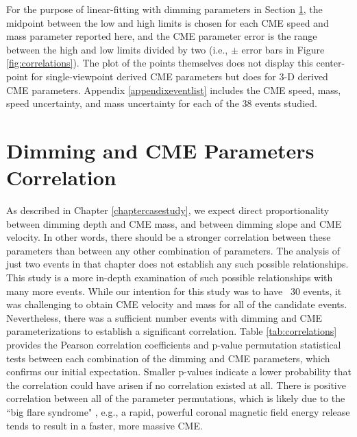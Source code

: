 For the purpose of linear-fitting with dimming parameters in Section \ref{sec:correlation}, the midpoint between the low and high limits is chosen for each CME speed and mass parameter reported here, and the CME parameter error is the range between the high and low limits divided by two (i.e., $\pm$ error bars in Figure \ref{fig:correlations}). The plot of the points themselves does not display this center-point for single-viewpoint derived CME parameters but does for 3-D derived CME parameters. Appendix \ref{appendixeventlist} includes the CME speed, mass, speed uncertainty, and mass uncertainty for each of the 38 events studied.

\section{Dimming and CME Parameters Correlation}
\label{sec:correlation}
As described in Chapter \ref{chaptercasestudy}, we expect direct proportionality between dimming depth and CME mass, and between dimming slope and CME velocity. In other words, there should be a stronger correlation between these parameters than between any other combination of parameters. The analysis of just two events in that chapter does not establish any such possible relationships. This study is a more in-depth examination of such possible relationships with many more events. While our intention for this study was to have ~30 events, it was challenging to obtain CME velocity and mass for all of the candidate events. Nevertheless, there was a sufficient number events with dimming and CME parameterizations to establish a significant correlation. Table \ref{tab:correlations} provides the Pearson correlation coefficients \citep{Pearson1895} and p-value permutation statistical tests between each combination of the dimming and CME parameters, which confirms our initial expectation. Smaller p-values indicate a lower probability that the correlation could have arisen if no correlation existed at all. There is positive correlation between all of the parameter permutations, which is likely due to the ``big flare syndrome" \citep{Kahler1982, Kahler1992}, e.g., a rapid, powerful coronal magnetic field energy release tends to result in a faster, more massive CME. 

